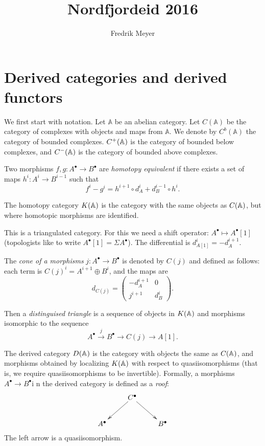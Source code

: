\documentclass[11pt, english]{article}
\begin{document}
\title{Nordfjordeid 2016}
\author{Fredrik Meyer}
\maketitle 

\section{Derived categories and derived functors}

We first start with notation. Let $\mathbb A$ be an abelian category. Let $C(\mathbb A)$ be the category of complexes with objects and maps from $\mathbb A$. We denote by $C^b(\mathbb A)$ the category of bounded complexes. $C^+(\mathbb{A})$ is the category of bounded below complexes, and $C^-(\mathbb{A})$ is the category of bounded above complexes.

\begin{defi}
Two morphisms $f,g:A^\bullet \to B^\bullet$ are \emph{homotopy equivalent} if there exists a set of maps $h^i:A^i \to B^{i-1}$ such that
\[
f^i-g^i = h^{i+1} \circ d^i_A + d^{i-1}_B \circ h^i.
\]
\end{defi}

The homotopy category $K(\mathbb{A})$ is the category with the same objects as $C(\mathbb{A})$, but where homotopic morphisms are identified.

This is a triangulated category. For this we need a shift operator: $A^\bullet \mapsto A^\bullet[1]$ (topologists like to write $A^\bullet[1]=\Sigma A^\bullet$). The differential is $d_{A[1]}^i=-d_A^{i+1}$. 

The \emph{cone of a morphisms} $j:A ^\bullet \to B^\bullet$ is denoted by $C(j)$ and defined as follows: each term is $C(j)^i=A^{i+1} \oplus  B^i$, and the maps are
\[
d_{C(j)} = \begin{pmatrix}
-d_A^{i+1} & 0 \\
j^{i+1} & d_B^i
\end{pmatrix}.
\]

Then a \emph{distinguised triangle} is a sequence of objects in $K(\mathbb{A})$ and morphisms isomorphic to the sequence
\[
A^\bullet \xrightarrow{j} B^\bullet \to C(j) \to A[1].
\]

The derived category $D(\mathbb{A})$ is the category with objects the same as $C(\mathbb{A})$, and morphisms obtained by localizing $K(\mathbb{A})$ with respect to quasiisomorphisms (that is, we require quasiisomorphisms to be invertible). Formally, a morphisms $A^\bullet \to B^\bullet$i n the derived category is defined as a \emph{roof}:
\[
\xymatrix{
& C^\bullet \ar[dl] \ar[dr]\\
A^\bullet & & B^\bullet
}
\]
The left arrow is a quasiisomorphism.
\end{document}
